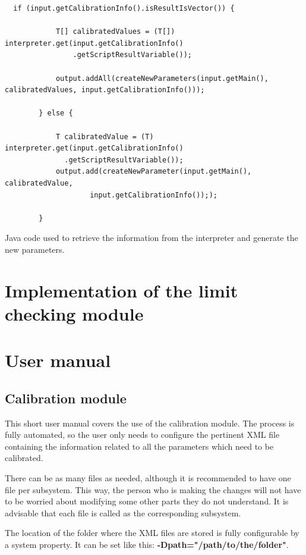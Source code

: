 \begin{table}[h]
\lstset{language=Java}
\begin{lstlisting}
  if (input.getCalibrationInfo().isResultIsVector()) {

            T[] calibratedValues = (T[]) interpreter.get(input.getCalibrationInfo()
                .getScriptResultVariable());

            output.addAll(createNewParameters(input.getMain(), calibratedValues, input.getCalibrationInfo()));

        } else {

            T calibratedValue = (T) interpreter.get(input.getCalibrationInfo()
              .getScriptResultVariable());
            output.add(createNewParameter(input.getMain(), calibratedValue,
                    input.getCalibrationInfo()););

        }
\end{lstlisting}
\caption{Java code used to retrieve the information from the interpreter and generate the new parameters.}
\label{Table5.3}
\end{table}


\section{Implementation of the limit checking module}


\section{User manual}
\subsection{Calibration module}
This short user manual covers the use of the calibration module. The process is fully automated, so the user only needs to configure the pertinent XML file containing the information related to all the parameters which need to be calibrated.

There can be as many files as needed, although it is recommended to have one file per subsystem. This way, the person who is making the changes will not have to be worried about modifying some other parts they do not understand. It is advisable that each file is called as the corresponding subsystem.


The location of the folder where the XML files are stored is fully configurable by a system property. It can be set like this: \textbf{-Dpath="/path/to/the/folder"}.

